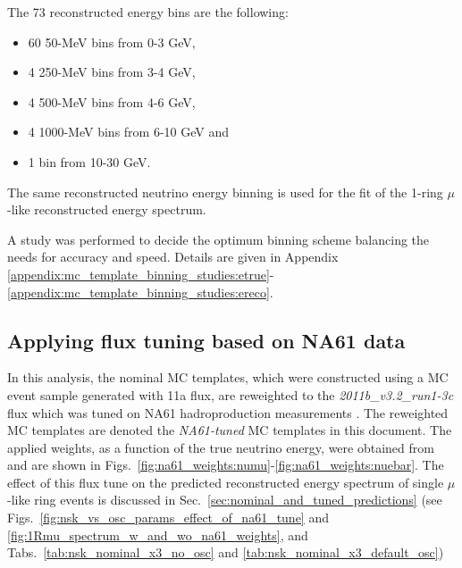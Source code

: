 The 73 reconstructed energy bins are the following:
\begin{itemize}
 \item   60 50-MeV bins from 0-3 GeV, 
 \item   4 250-MeV bins from 3-4 GeV, 
 \item   4 500-MeV bins from 4-6 GeV, 
 \item   4 1000-MeV bins from 6-10 GeV and
 \item   1 bin from 10-30 GeV.
\end{itemize}
The same reconstructed neutrino energy binning is used for the fit of the 1-ring $\mu$-like reconstructed energy spectrum.

A study was performed to decide the optimum binning scheme balancing the needs for accuracy and speed.
Details are given in Appendix \ref{appendix:mc_template_binning_studies:etrue}-\ref{appendix:mc_template_binning_studies:ereco}.

\subsection {Applying flux tuning based on NA61 data}
\label{sec:na61_weights}

In this analysis, the nominal MC templates, which were constructed using a MC event sample generated with 11a flux,
are reweighted to the {\em 2011b\_v3.2\_run1-3c} flux which was tuned on NA61 hadroproduction measurements \cite{FluxTuning}\cite{NA61T2K}.
The reweighted MC templates are denoted the {\em NA61-tuned} MC templates in this document.
The applied weights, as a function of the true neutrino energy, were obtained from \cite{FluxTuningHistograms}
and are shown in Figs.\ \ref{fig:na61_weights:numu}-\ref{fig:na61_weights:nuebar}.
The effect of this flux tune on the predicted reconstructed energy spectrum of 
single $\mu$-like ring events is discussed in Sec.\ \ref{sec:nominal_and_tuned_predictions} 
(see Figs.\ \ref{fig:nsk_vs_osc_params_effect_of_na61_tune} and \ref{fig:1Rmu_spectrum_w_and_wo_na61_weights}, and 
Tabs.\ \ref{tab:nsk_nominal_x3_no_osc} and \ref{tab:nsk_nominal_x3_default_osc})


